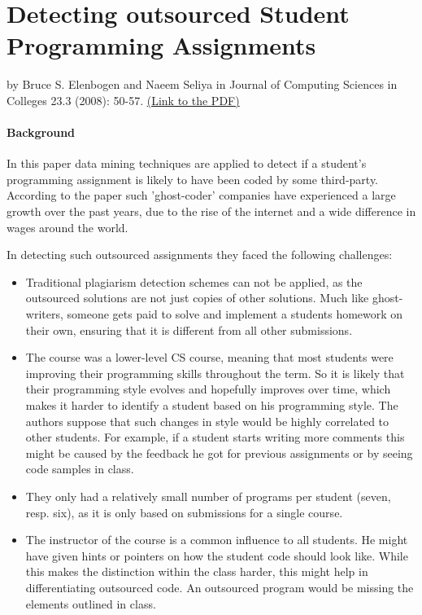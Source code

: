 \section{Detecting outsourced Student Programming Assignments}
by Bruce S. Elenbogen and Naeem Seliya in Journal of Computing Sciences in Colleges 23.3 (2008): 50-57.
\href{http://dl.acm.org/ft_gateway.cfm?id=1295123&ftid=466864&dwn=1&CFID=324710951&CFTOKEN=75941419}{(Link to the PDF)}

\paragraph{Background}
In this paper data mining techniques are applied to detect if a student's programming assignment is likely to have been coded by some third-party. According to the paper such 'ghost-coder' companies have experienced a large growth over the past years, due to the rise of the internet and a wide difference in wages around the world.

In detecting such outsourced assignments they faced the following challenges:
\begin{itemize}
\item Traditional plagiarism detection schemes can not be applied, as the outsourced solutions are not just copies of other solutions. Much like ghost-writers, someone gets paid to solve and implement a students homework on their own, ensuring that it is different from all other submissions.
\item The course was a lower-level CS course, meaning that most students were improving their programming skills throughout the term. So it is likely that their programming style evolves and hopefully improves over time, which makes it harder to identify a student based on his programming style. The authors suppose that such changes in style would be highly correlated to other students. For example, if a student starts writing more comments this might be caused by the feedback he got for previous assignments or by seeing code samples in class.
\item They only had a relatively small number of programs per student (seven, resp. six), as it is only based on submissions for a single course.
\item The instructor of the course is a common influence to all students. He might have given hints or pointers on how the student code should look like. While this makes the distinction within the class harder, this might help in differentiating outsourced code. An outsourced program would be missing the elements outlined in class.
\end{itemize}

